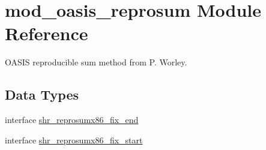 \hypertarget{namespacemod__oasis__reprosum}{}\section{mod\+\_\+oasis\+\_\+reprosum Module Reference}
\label{namespacemod__oasis__reprosum}


O\+A\+S\+IS reproducible sum method from P. Worley.  


\subsection*{Data Types}
\begin{DoxyCompactItemize}
\item 
interface \hyperlink{interfacemod__oasis__reprosum_1_1shr__reprosumx86__fix__end}{shr\+\_\+reprosumx86\+\_\+fix\+\_\+end}
\item 
interface \hyperlink{interfacemod__oasis__reprosum_1_1shr__reprosumx86__fix__start}{shr\+\_\+reprosumx86\+\_\+fix\+\_\+start}
\end{DoxyCompactItemize}

